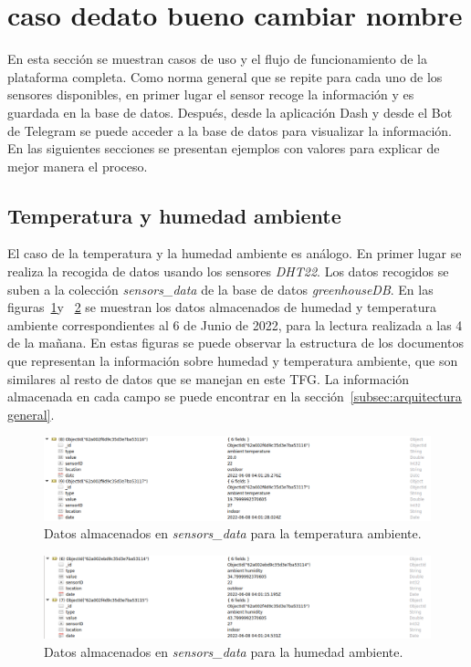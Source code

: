 \documentclass[a4paper, 12pt, oneside]{book}
\begin{document}
\section{caso dedato bueno cambiar nombre}
\label{sec:aplicación de dash ejemplos}
En esta sección se muestran casos de uso y el flujo de funcionamiento de la plataforma completa.
Como norma general que se repite para cada uno de los sensores disponibles, en primer lugar el sensor recoge la información y es guardada en la base de datos. Después, desde la aplicación Dash y desde el Bot de Telegram se puede acceder a la base de datos para visualizar la información. En las siguientes secciones se presentan ejemplos con valores para explicar de mejor manera el proceso.

\subsection{Temperatura y humedad ambiente}
\label{subsec: temperatura y humedad ambiente}
El caso de la temperatura y la humedad ambiente es análogo. En primer lugar se realiza la recogida de datos usando los sensores \textit{DHT22}. Los datos recogidos se suben a la colección \textit{sensors\_data} de la base de datos \textit{greenhouseDB}. En las figuras~\ref{figura:robo3t_ambient_temperature}y ~\ref{figura:robo3t_ambient_humidity} se muestran los datos almacenados de humedad y temperatura ambiente correspondientes al 6 de Junio de 2022, para la lectura realizada a las 4 de la mañana. En estas figuras se puede observar la estructura de los documentos que representan la información sobre humedad y temperatura ambiente, que son similares al resto de datos que se manejan en este TFG. La información almacenada en cada campo se puede encontrar en la sección~\ref{subsec:arquitectura general}.

\begin{figure}[H]
	\centering
    \includegraphics[width=12cm, keepaspectratio]{img/robo3t_ambient_temperature}
    \caption{Datos almacenados en \textit{sensors\_data} para la temperatura ambiente.}
    \label{figura:robo3t_ambient_temperature}
\end{figure}
\begin{figure}[H]
	\centering
    \includegraphics[width=12cm, keepaspectratio]{img/robo3t_ambient_humidity}
    \caption{Datos almacenados en \textit{sensors\_data} para la humedad ambiente.}
    \label{figura:robo3t_ambient_humidity}
\end{figure} 
\end{document}
